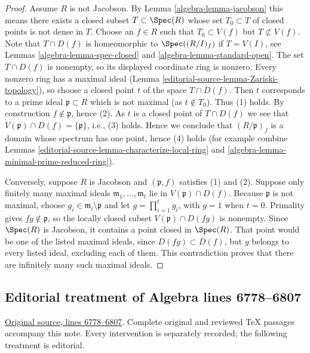 \begin{proof}
Assume $R$ is not Jacobson.
By Lemma \ref{algebra-lemma-jacobson} this means there exists a
closed subset $T \subset \Spec(R)$
whose set $T_0 \subset T$ of closed points is not dense in $T$.
Choose an $f \in R$ such that $T_0 \subset V(f)$ but
$T \not \subset V(f)$. Note that $T \cap D(f)$
is homeomorphic to $\Spec((R/I)_f)$ if $T = V(I)$, see
Lemmas \ref{algebra-lemma-spec-closed} and \ref{algebra-lemma-standard-open}.
The set $T\cap D(f)$ is nonempty, so its displayed coordinate ring
is nonzero. Every nonzero ring has a maximal ideal
(Lemma \ref{editorial-source-lemma-Zariski-topology}), so choose a closed point $t$
of the space $T\cap D(f)$. Then $t$ corresponds to a prime ideal
$\mathfrak p \subset R$ which is not maximal (as $t \not \in T_0$).
Thus (1) holds. By construction $f \not \in \mathfrak p$, hence (2).
As $t$ is a closed point of $T \cap D(f)$ we see that
$V(\mathfrak p) \cap D(f) = \{\mathfrak p\}$, i.e., (3) holds. Hence we
conclude that $(R/\mathfrak p)_f$ is a domain whose
spectrum has one point, hence (4) holds
(for example combine Lemmas \ref{editorial-source-lemma-characterize-local-ring} and
\ref{algebra-lemma-minimal-prime-reduced-ring}).

\medskip\noindent
Conversely, suppose $R$ is Jacobson and $(\mathfrak p,f)$ satisfies
(1) and (2). Suppose only finitely many maximal ideals
$\mathfrak m_1,\ldots,\mathfrak m_t$ lie in
$V(\mathfrak p)\cap D(f)$. Because $\mathfrak p$ is not maximal,
choose $g_i\in\mathfrak m_i\setminus\mathfrak p$ and let
$g=\prod_{i=1}^t g_i$, with $g=1$ when $t=0$.
Primality gives $fg\notin\mathfrak p$, so the locally closed subset
$V(\mathfrak p)\cap D(fg)$ is nonempty. Since $\Spec(R)$ is Jacobson,
it contains a point closed in $\Spec(R)$. That point would be one of
the listed maximal ideals, since $D(fg)\subset D(f)$, but $g$ belongs
to every listed ideal, excluding each of them. This contradiction
proves that there are infinitely many such maximal ideals.
\end{proof}


\subsection{Editorial treatment of Algebra lines 6778--6807}

\hypertarget{algebra-context-057}{}

\noindent\href{https://github.com/stacks/stacks-project/blob/a04446e57ec1fbc252a871afcec7752fb2807b14/algebra.tex\#L6778}{Original source, lines 6778--6807}. Complete original and reviewed TeX passages accompany this note. Every intervention is separately recorded; the following treatment is editorial.


